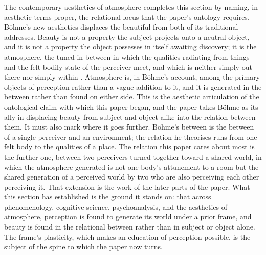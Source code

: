 The contemporary aesthetics of atmosphere completes this section by naming, in aesthetic terms proper, the relational locus that the paper's ontology requires. B\"{o}hme's new aesthetics displaces the beautiful from both of its traditional addresses. Beauty is not a property the subject projects onto a neutral object, and it is not a property the object possesses in itself awaiting discovery; it is the atmosphere, the tuned in-between in which the qualities radiating from things and the felt bodily state of the perceiver meet, and which is neither simply out there nor simply within \parencite{bohme2017}. Atmosphere is, in B\"{o}hme's account, among the primary objects of perception rather than a vague addition to it, and it is generated in the between rather than found on either side. This is the aesthetic articulation of the ontological claim with which this paper began, and the paper takes B\"{o}hme as its ally in displacing beauty from subject and object alike into the relation between them. It must also mark where it goes further. B\"{o}hme's between is the between of a single perceiver and an environment; the relation he theorises runs from one felt body to the qualities of a place. The relation this paper cares about most is the further one, between two perceivers turned together toward a shared world, in which the atmosphere generated is not one body's attunement to a room but the shared generation of a perceived world by two who are also perceiving each other perceiving it. That extension is the work of the later parts of the paper. What this section has established is the ground it stands on: that across phenomenology, cognitive science, psychoanalysis, and the aesthetics of atmosphere, perception is found to generate its world under a prior frame, and beauty is found in the relational between rather than in subject or object alone. The frame's plasticity, which makes an education of perception possible, is the subject of the spine to which the paper now turns.
